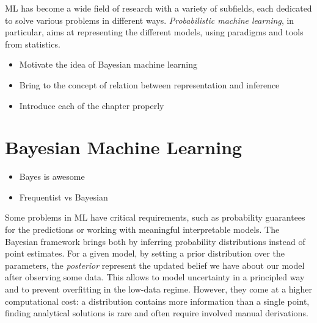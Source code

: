 

\ifpdf
    \graphicspath{{chapters/1_introduction/figures/}}
\else
    \graphicspath{{1_introduction/figures/EPS/}{1_introduction/figures/}}
\fi


\ac{ML} has become a wide field of research with a variety of subfields, each dedicated to solve various problems in different ways.
\textit{Probabilistic machine learning}, in particular, aims at representing the different models, using paradigms and tools from statistics.

\begin{itemize}
    \item Motivate the idea of Bayesian machine learning
    \item Bring to the concept of relation between representation and inference
    \item Introduce each of the chapter properly
\end{itemize}


\section{Bayesian Machine Learning}

\begin{itemize}
    \item Bayes is awesome
    \item Frequentist vs Bayesian
\end{itemize}

Some problems in \ac{ML} have critical requirements, such as probability guarantees for the predictions or working with meaningful interpretable models.
The Bayesian framework brings both by inferring probability distributions instead of point estimates.
For a given model, by setting a prior distribution over the parameters, the \textit{posterior} represent the updated belief we have about our model after observing some data.
This allows to model uncertainty in a principled way and to prevent overfitting in the low-data regime.
However, they come at a higher computational cost: a distribution contains more information than a single point, finding analytical solutions is rare and often require involved manual derivations.

